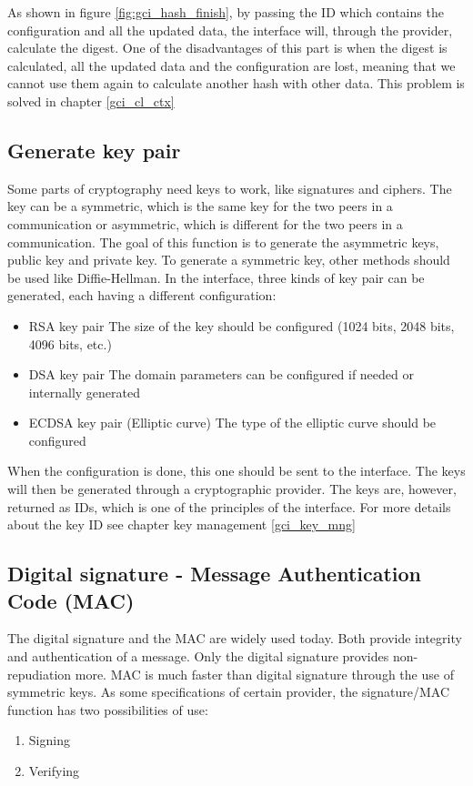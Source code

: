 As shown in figure \ref{fig:gci_hash_finish}, by passing the ID which contains
the configuration and all the updated data, the interface will, through the
provider, calculate the digest.
One of the disadvantages of this part is
when the digest is calculated, all the updated data and the configuration are lost, meaning that we cannot use them
again to calculate another hash with other data.
This problem is solved in chapter \ref{gci_cl_ctx}

\subsection{Generate key pair}
\label{gci_gen_key}

Some parts of cryptography need keys to work, like signatures and ciphers.
The key can be a symmetric, which is the same key for the two peers
in a communication or asymmetric, which is different for the two peers in a
communication.
The goal of this function is to generate the asymmetric keys, public key and
private key. To generate a symmetric key, other methods should be used like
Diffie-Hellman.
In the interface, three kinds of key pair can be generated, each having a
different configuration:
\begin{itemize}
  \item RSA key pair\newline
  The size of the key should be configured (1024 bits, 2048 bits, 4096 bits,
  etc.)
  \item DSA key pair\newline
  The domain parameters can be configured if needed or internally generated
  \item ECDSA key pair (Elliptic curve)\newline
  The type of the elliptic curve should be configured
\end{itemize}

When the configuration is done, this one should be sent to the
interface.
The keys will then be generated through a cryptographic provider.
The keys are, however, returned as IDs, which is one of the principles of the
interface. For more details about the key ID see chapter key management
\ref{gci_key_mng}

\subsection{Digital signature - Message Authentication Code (MAC)}
\label{gci_sign_mac}

The digital signature and the MAC are widely used today. Both provide integrity
and authentication of a message. Only the digital signature provides
non-repudiation more. MAC is much faster than digital signature through the use
of symmetric keys.
As some specifications of certain provider, the signature/MAC function has two
possibilities of use:
\begin{enumerate}[noitemsep]
  \item Signing
  \item Verifying\newline
\end{enumerate}


